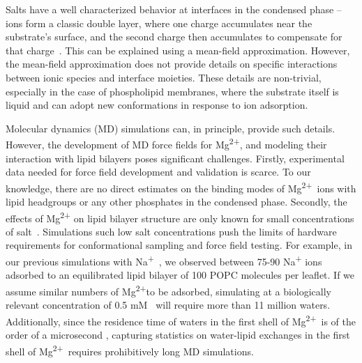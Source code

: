 \documentclass[journal=langd5,manuscript=article]{achemso}
\newcommand{\na}{Na\textsuperscript{+}}
\newcommand{\mg}{Mg\textsuperscript{2+}}
\begin{document}
Salts have a well characterized behavior at interfaces in the condensed phase -- ions form a classic double layer, where
one charge accumulates near the substrate's surface, and the second charge then accumulates to compensate for 
that charge~\cite{israelachvili:2011:intermol}.
This can be explained using a mean-field approximation. 
However, the mean-field approximation does not provide details on specific interactions between ionic species and 
interface moieties. These details are non-trivial, especially in the case of
phospholipid membranes, where the substrate itself is liquid and can adopt new conformations in response to ion adsorption. 

Molecular dynamics (MD) simulations can, in principle, provide such details. 
However, the development of MD force fields for \mg{}, and modeling their interaction with lipid bilayers poses significant challenges.
Firstly, experimental data needed for force field development and validation is scarce.
To our knowledge, there are no direct estimates on the binding modes of \mg~ions with lipid headgroups or any other phosphates in the condensed phase. 
Secondly, the effects of \mg{} on lipid bilayer structure are only known for small concentrations
of salt~\cite{kurakin:2022:cations,kurakin:2021:effect}.
Simulations such low salt concentrations push the limits of hardware requirements for conformational sampling and force field testing. 
For example, in our previous simulations with \na{}~\cite{saunders:2022}, we observed between 75-90 \na{} ions adsorbed to an equilibrated lipid bilayer of 
100 POPC molecules per leaflet. If we assume similar numbers of \mg to be adsorbed, 
simulating at a biologically relevant concentration of 0.5 mM~\cite{romani:1992:regulation} will require more than 11 million waters.
Additionally, since the residence time of waters in the first shell of \mg~is 
of the order of a microsecond \cite{neely:1970,Palinkas:1982,bleuzen:1997}, 
capturing statistics on water-lipid exchanges in the first shell of \mg~requires prohibitively long MD simulations. 
\end{document}
